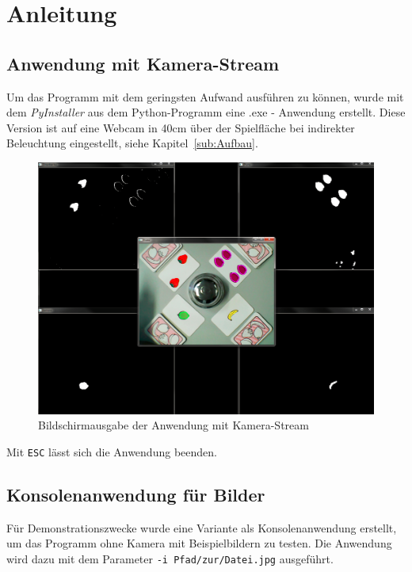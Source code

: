 
\section{Anleitung}
\label{sec:Anleitung}

\subsection{Anwendung mit Kamera-Stream}

Um das Programm mit dem geringsten Aufwand ausführen zu können, wurde mit dem \emph{PyInstaller} aus dem Python-Programm eine .exe - Anwendung erstellt. Diese Version ist auf eine Webcam in 40cm über der Spielfläche bei indirekter Beleuchtung eingestellt, siehe Kapitel~\ref{sub:Aufbau}.
\begin{figure}[H]
    \centering
    \includegraphics[width=15cm]{Abbildungen/HalliGalli01}
    \caption[Aus]{Bildschirmausgabe der Anwendung mit Kamera-Stream}
    \label{fig:Ausgabe}
\end{figure}
Mit \lstinline{ESC} lässt sich die Anwendung beenden.

\subsection{Konsolenanwendung für Bilder}
Für Demonstrationszwecke wurde eine Variante als Konsolenanwendung erstellt, um das Programm ohne Kamera mit Beispielbildern zu testen.
Die Anwendung wird dazu mit dem Parameter \lstinline{-i Pfad/zur/Datei.jpg} ausgeführt.

